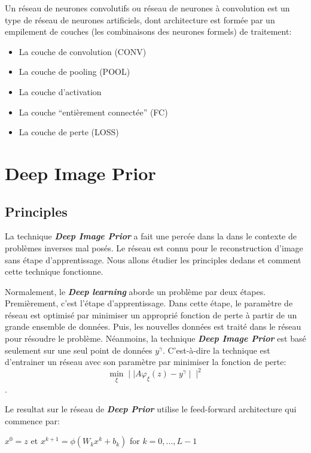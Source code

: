 \documentclass[
  11pt,
  dvipsnames]{article}
\providecommand{\tightlist}{%
  \setlength{\itemsep}{0pt}\setlength{\parskip}{0pt}}
\begin{document}
Un réseau de neurones convolutifs ou réseau de neurones à convolution
est un type de réseau de neurones artificiels, dont architecture est formée par
un empilement de couches (les combinaisons des neurones formels) de traitement:

\begin{itemize}
\tightlist
\item
  La couche de convolution (CONV)
\item
  La couche de pooling (POOL)
\item
  La couche d'activation
\item
  La couche ``entièrement connectée'' (FC)
\item
  La couche de perte (LOSS)
\end{itemize}

\newpage

\hypertarget{deep-image-prior}{%
\section{Deep Image Prior}\label{deep-image-prior}}

\hypertarget{principles}{%
\subsection{Principles}\label{principles}}

La technique \textbf{\emph{Deep Image Prior}} a fait une percée dans la dans le contexte
de problèmes inverses mal posés. Le réseau est connu pour le reconstruction d'image sans étape d'apprentissage. Nous allons étudier les principles dedans et comment cette technique fonctionne.

Normalement, le \textbf{\emph{Deep learning}} aborde un problème par deux étapes. Premièrement, c'est l'étape d'apprentissage.
Dans cette étape, le paramètre de réseau est optimisé par minimiser un approprié fonction de perte à partir de
un grande ensemble de données. Puis, les nouvelles données est traité dans le réseau pour résoudre le problème.
Néanmoins, la technique \textbf{\emph{Deep Image Prior}} est basé seulement sur une seul point de données \(y^\gamma\). C'est-à-dire
la technique est d'entrainer un réseau avec son paramètre par minimiser la fonction de perte: \[\min_{\xi} \mid\mid A\varphi_\xi(z) - y^\gamma \mid\mid^2\].

Le resultat sur le réseau de \textbf{\emph{Deep Prior}} utilise le feed-forward architecture qui commence par:

\begin{center} $x^0 = z$    et    $x^{k+1} = \phi (W_k x^k + b_k)$ for $k = 0,...,L-1$  \end{center}
\end{document}
